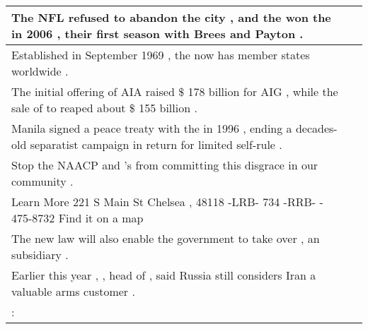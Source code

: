 \begin{longtable}{p{} P{1,3cm} }
  {The NFL refused to abandon the city , and the \underline{} won the \underline{} in 2006 , their first season with Brees and Payton .} &    \\ 
\hline
{}  {Established in September 1969 , the \underline{} now has \underline{} member states worldwide .} &    \\ 
\hline
{}  {The initial offering of AIA raised \$ 178 billion for AIG , while the sale of \underline{} to \underline{} reaped about \$ 155 billion .} &    \\ 
\hline
{}  {Manila signed a peace treaty with the \underline{} in 1996 , ending a decades-old separatist campaign in return for limited \underline{} self-rule .} &    \\ 
\hline
{}  {Stop the NAACP and \underline{} 's \underline{} from committing this disgrace in our community .} &    \\ 
\hline
{}  {Learn More \underline{} 221 S Main St Chelsea , \underline{} 48118 -LRB- 734 -RRB- - 475-8732 Find it on a map} &    \\ 
\hline
{}  {The new law will also enable the government to take over \underline{} , an \underline{} subsidiary .} &    \\ 
\hline
{}  {Earlier this year , \underline{} , head of \underline{} , said Russia still considers Iran a valuable arms customer .} &    \\ 
\hline
{}  {\underline{} : \underline{}} &    \\ 
\hline


\end{longtable}
